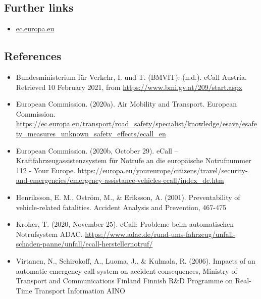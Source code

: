 \documentclass[
]{book}
\providecommand{\tightlist}{%
  \setlength{\itemsep}{0pt}\setlength{\parskip}{0pt}}
\begin{document}
\hypertarget{further-links-24}{%
\subsection*{Further links}\label{further-links-24}}

\begin{itemize}
\tightlist
\item
  \href{https://ec.europa.eu/transport/road_safety/specialist/knowledge/esave/esafety_measures_unknown_safety_effects/ecall_en}{ec.europa.eu}
\end{itemize}

\hypertarget{references-27}{%
\subsection*{References}\label{references-27}}

\begin{itemize}
\tightlist
\item
  Bundesministerium für Verkehr, I. und T. (BMVIT). (n.d.). eCall Austria. Retrieved 10 February 2021, from \url{https://www.bmi.gv.at/209/start.aspx}
\item
  European Commission. (2020a). Air \textbar{} Mobility and Transport. European Commission. \url{https://ec.europa.eu/transport/road_safety/specialist/knowledge/esave/esafety_measures_unknown_safety_effects/ecall_en}
\item
  European Commission. (2020b, October 29). eCall -- Kraftfahrzeugassistenzsystem für Notrufe an die europäische Notrufnummer 112 - Your Europe. \url{https://europa.eu/youreurope/citizens/travel/security-and-emergencies/emergency-assistance-vehicles-ecall/index_de.htm}
\item
  Henriksson, E. M., Oström, M., \& Eriksson, A. (2001). Preventability of vehicle-related fatalities. Accident Analysis and Prevention, 467-475
\item
  Kroher, T. (2020, November 25). eCall: Probleme beim automatischen Notrufsystem \textbar{} ADAC. \url{https://www.adac.de/rund-ums-fahrzeug/unfall-schaden-panne/unfall/ecall-herstellernotruf/}
\item
  Virtanen, N., Schirokoff, A., Luoma, J., \& Kulmala, R. (2006). Impacts of an automatic emergency call system on accident consequences, Ministry of Transport and Communications Finland Finnish R\&D Programme on Real-Time Transport Information AINO
\end{itemize}
\end{document}

